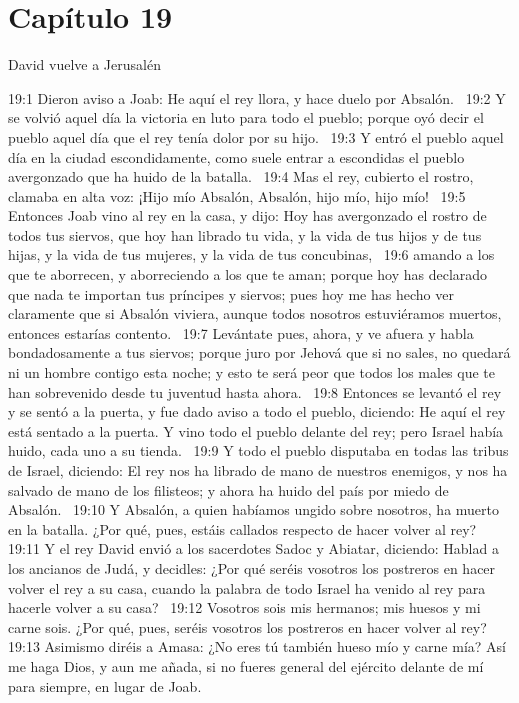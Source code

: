 \section*{Capítulo 19 }
David vuelve a Jerusalén  

19:1 Dieron aviso a Joab: He aquí el rey llora, y hace duelo por Absalón.  
19:2 Y se volvió aquel día la victoria en luto para todo el pueblo; porque oyó decir el pueblo aquel día que el rey tenía dolor por su hijo.  
19:3 Y entró el pueblo aquel día en la ciudad escondidamente, como suele entrar a escondidas el pueblo avergonzado que ha huido de la batalla.  
19:4 Mas el rey, cubierto el rostro, clamaba en alta voz: ¡Hijo mío Absalón, Absalón, hijo mío, hijo mío!  
19:5 Entonces Joab vino al rey en la casa, y dijo: Hoy has avergonzado el rostro de todos tus siervos, que hoy han librado tu vida, y la vida de tus hijos y de tus hijas, y la vida de tus mujeres, y la vida de tus concubinas,  
19:6 amando a los que te aborrecen, y aborreciendo a los que te aman; porque hoy has declarado que nada te importan tus príncipes y siervos; pues hoy me has hecho ver claramente que si Absalón viviera, aunque todos nosotros estuviéramos muertos, entonces estarías contento.  
19:7 Levántate pues, ahora, y ve afuera y habla bondadosamente a tus siervos; porque juro por Jehová que si no sales, no quedará ni un hombre contigo esta noche; y esto te será peor que todos los males que te han sobrevenido desde tu juventud hasta ahora.  
19:8 Entonces se levantó el rey y se sentó a la puerta, y fue dado aviso a todo el pueblo, diciendo: He aquí el rey está sentado a la puerta. Y vino todo el pueblo delante del rey; pero Israel había huido, cada uno a su tienda.  
19:9 Y todo el pueblo disputaba en todas las tribus de Israel, diciendo: El rey nos ha librado de mano de nuestros enemigos, y nos ha salvado de mano de los filisteos; y ahora ha huido del país por miedo de Absalón.  
19:10 Y Absalón, a quien habíamos ungido sobre nosotros, ha muerto en la batalla. ¿Por qué, pues, estáis callados respecto de hacer volver al rey? 
19:11 Y el rey David envió a los sacerdotes Sadoc y Abiatar, diciendo: Hablad a los ancianos de Judá, y decidles: ¿Por qué seréis vosotros los postreros en hacer volver el rey a su casa, cuando la palabra de todo Israel ha venido al rey para hacerle volver a su casa?  
19:12 Vosotros sois mis hermanos; mis huesos y mi carne sois. ¿Por qué, pues, seréis vosotros los postreros en hacer volver al rey?  
19:13 Asimismo diréis a Amasa: ¿No eres tú también hueso mío y carne mía? Así me haga Dios, y aun me añada, si no fueres general del ejército delante de mí para siempre, en lugar de Joab.  
